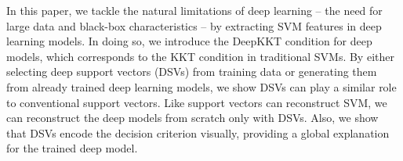{{In this paper, we tackle the natural limitations of deep learning -- the need for large data and black-box characteristics -- by extracting SVM features in deep learning models. In doing so, we introduce the DeepKKT condition for deep models, which corresponds to the KKT condition in traditional SVMs. By either selecting deep support vectors (DSVs) from training data or generating them from already trained deep learning models,
we show DSVs can play a similar role to conventional support vectors. Like support vectors can reconstruct SVM, we can reconstruct the deep models from scratch only with DSVs. Also, we show that DSVs encode the decision criterion visually, providing a global explanation for the trained deep model.



}}
